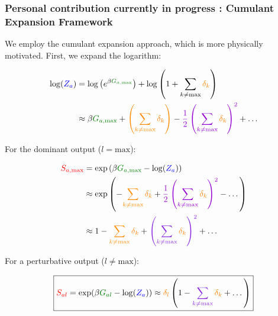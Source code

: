 \documentclass[a4paper]{article}
\theoremstyle{plain}
\theoremstyle{definition}
\theoremstyle{remark}
\begin{document}
\subsubsection{Personal contribution currently in progress : Cumulant Expansion Framework}

We employ the cumulant expansion approach, which is more physically motivated. First, we expand the logarithm:

\begin{align}
\log(\textcolor{blue}{Z_a}) &= \log\left(e^{\beta \textcolor{greencolor}{G_{a, \text{max}}}}\right) + \log\left( 1 + \sum_{k \neq \text{max}} \textcolor{orange}{\delta_k} \right) \\
&\approx \beta \textcolor{greencolor}{G_{a, \text{max}}} + \textcolor{insightcolor}{\left(\sum_{k \neq \text{max}} \textcolor{orange}{\delta_k}\right)} - \textcolor{k3color}{\frac{1}{2}\left(\sum_{k \neq \text{max}} \textcolor{orange}{\delta_k}\right)^2} + \dots \label{eq:log_expansion}
\end{align}

For the dominant output ($l=\text{max}$):

\begin{align}
\textcolor{red}{S_{a, \text{max}}} &= \exp\left(\beta \textcolor{greencolor}{G_{a, \text{max}}} - \log(\textcolor{blue}{Z_a})\right) \\
&\approx \exp\left( - \textcolor{insightcolor}{\sum_{k \neq \text{max}} \textcolor{orange}{\delta_k}} + \textcolor{k3color}{\frac{1}{2}\left(\sum_{k \neq \text{max}} \textcolor{orange}{\delta_k}\right)^2} - \dots \right) \\
&\approx 1 - \textcolor{insightcolor}{\sum_{k \neq \text{max}} \textcolor{orange}{\delta_k}} + \textcolor{methodcolor}{\left(\sum_{k \neq \text{max}} \textcolor{orange}{\delta_k}\right)^2} + \dots \label{eq:dominant_softmax}
\end{align}

For a perturbative output ($l \neq \text{max}$):

\begin{equation}
\boxed{\textcolor{red}{S_{al}} = \exp(\beta \textcolor{greencolor}{G_{al}} - \log(\textcolor{blue}{Z_a})) \approx \textcolor{orange}{\delta_l} \left(1 - \textcolor{methodcolor}{\sum_{k \neq \text{max}} \textcolor{orange}{\delta_k}} + \dots \right)} \label{eq:perturbative_softmax}
\end{equation}
\end{document}
